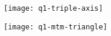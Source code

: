 \begin{parts}
\begin{subparts}
		\subpart \todo
		\begin{figure}[H]
			\centering
			\texttt{[image: q1-triple-axis]}
		\end{figure}
		\begin{figure}[H]
			\centering
			\texttt{[image: q1-mtm-triangle]}
		\end{figure}
	\end{subparts}
\end{parts}